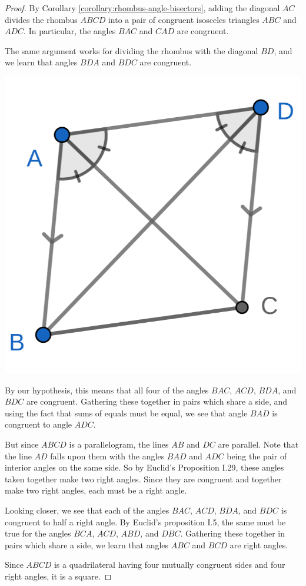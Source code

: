 \documentclass{tufte-handout}
\theoremstyle{definition}
\begin{document}
\begin{proof}
By Corollary \ref{corollary:rhombus-angle-bisectors}, adding the diagonal $AC$ divides the rhombus $ABCD$ into a pair of congruent isosceles triangles $ABC$ and $ADC$. In particular, the angles $BAC$ and $CAD$ are congruent.

The same argument works for dividing the rhombus with the diagonal $BD$, and we learn that angles $BDA$ and $BDC$ are congruent.

\begin{marginfigure}
  \includegraphics{images/rhombus_rigidity.png}
\end{marginfigure}

By our hypothesis, this means that all four of the angles $BAC$, $ACD$, $BDA$, and $BDC$ are congruent. Gathering these together in pairs which share a side, and using the fact that sums of equals must be equal, we see that angle $BAD$ is congruent to angle $ADC$.

But since $ABCD$ is a parallelogram, the lines $AB$ and $DC$ are parallel. Note that the line $AD$ falls upon them with the angles $BAD$ and $ADC$ being the pair of interior angles on the same side. So by Euclid's Proposition I.29, these angles taken together make two right angles. Since they are congruent and together make two right angles, each must be a right angle.

Looking closer, we see that each of the angles $BAC$, $ACD$, $BDA$, and $BDC$ is congruent to half a right angle.
By Euclid's proposition I.5, the same must be true for the angles $BCA$, $ACD$, $ABD$, and $DBC$. Gathering these together in pairs which share a side, we learn that angles $ABC$ and $BCD$ are right angles.

Since $ABCD$ is a quadrilateral having four mutually congruent sides and four right angles, it is a square.
\end{proof}
\end{document}
